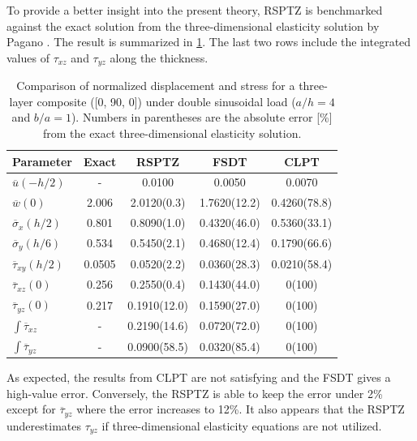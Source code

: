 \documentclass{article}
\begin{document}
To provide a better insight into the present theory, RSPTZ is benchmarked against the exact solution from the three-dimensional elasticity solution by Pagano \cite{Pagano1969}. The result is summarized in \cref{tab:3d_elast_cmp}. The last two rows include the integrated values of $\tau_{xz}$ and $\tau_{yz}$ along the thickness.

\begin{table}[H]
\centering
\caption{Comparison of normalized displacement and stress for a three-layer composite ([0, 90, 0]) under double sinusoidal load ($a/h=4$ and $b/a=1$). Numbers in parentheses are the absolute error [\%] from the exact three-dimensional elasticity solution.}
\begin{tabular}{lcccc}
\hline
\textbf{Parameter} & \textbf{Exact} & \textbf{RSPTZ} & \textbf{FSDT} & \textbf{CLPT}\\ \hline
$\overline{u}(-h/2)$ & - & 0.0100 & 0.0050 & 0.0070 \\
$\overline{w}(0)$ & 2.006 & 2.0120(0.3) & 1.7620(12.2) & 0.4260(78.8) \\
$\overline{\sigma}_{x}(h/2)$ & 0.801 & 0.8090(1.0) & 0.4320(46.0) & 0.5360(33.1) \\
$\overline{\sigma}_{y}(h/6)$ & 0.534 & 0.5450(2.1) & 0.4680(12.4) & 0.1790(66.6) \\
$\overline{\tau}_{xy}(h/2)$ & 0.0505 & 0.0520(2.2) & 0.0360(28.3) & 0.0210(58.4) \\
$\overline{\tau}_{xz}(0)$ & 0.256 & 0.2550(0.4) & 0.1430(44.0) & 0(100) \\
$\overline{\tau}_{yz}(0)$ & 0.217 & 0.1910(12.0) & 0.1590(27.0) & 0(100) \\
$\int\overline{\tau}_{xz}$ & - & 0.2190(14.6) & 0.0720(72.0) & 0(100) \\
$\int\overline{\tau}_{yz}$ & - & 0.0900(58.5) & 0.0320(85.4) & 0(100) \\ \hline
\end{tabular}
\label{tab:3d_elast_cmp}
\end{table}

As expected, the results from CLPT are not satisfying and the FSDT gives a high-value error. Conversely, the RSPTZ is able to keep the error under 2\% except for $\overline{\tau}_{yz}$ where the error increases to 12\%. It also appears that the RSPTZ underestimates $\tau_{yz}$ if three-dimensional elasticity equations are not utilized.
\end{document}
